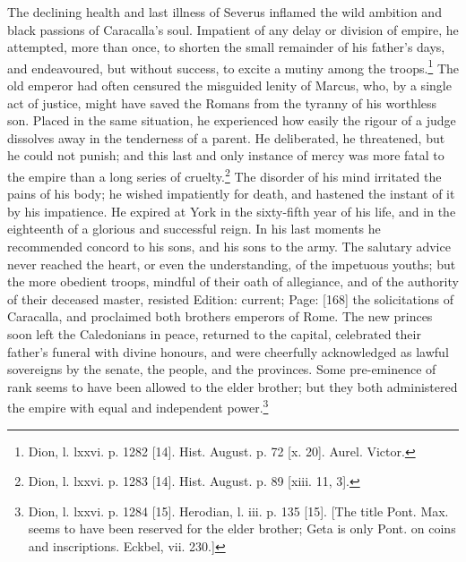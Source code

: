 The declining health and last illness of Severus inflamed the wild ambition and black passions of Caracalla\texthebrew{}’s soul. Impatient of any delay or division of empire, he attempted, more than once, to shorten the small remainder of his father\texthebrew{}’s days, and endeavoured, but without success, to excite a mutiny among the troops.\footnote{Dion, l. lxxvi. p. 1282 [14]. Hist. August. p. 72 [x. 20]. Aurel. Victor.} The old emperor had often censured the misguided lenity of Marcus, who, by a single act of justice, might have saved the Romans from the tyranny of his worthless son. Placed in the same situation, he experienced how easily the rigour of a judge dissolves away in the tenderness of a parent. He deliberated, he threatened, but he could not punish; and this last and only instance of mercy was more fatal to the empire than a long series of cruelty.\footnote{Dion, l. lxxvi. p. 1283 [14]. Hist. August. p. 89 [xiii. 11, 3].} The disorder of his mind irritated the pains of his body; he wished impatiently for death, and hastened the instant of it by his impatience. He expired at York in the sixty-fifth year of his life, and in the eighteenth of a glorious and successful reign. In his last moments he recommended concord to his sons, and his sons to the army. The salutary advice never reached the heart, or even the understanding, of the impetuous youths; but the more obedient troops, mindful of their oath of allegiance, and of the authority of their deceased master, resisted Edition: current; Page: [168] the solicitations of Caracalla, and proclaimed both brothers emperors of Rome. The new princes soon left the Caledonians in peace, returned to the capital, celebrated their father\texthebrew{}’s funeral with divine honours, and were cheerfully acknowledged as lawful sovereigns by the senate, the people, and the provinces. Some pre-eminence of rank seems to have been allowed to the elder brother; but they both administered the empire with equal and independent power.\footnote{Dion, l. lxxvi. p. 1284 [15]. Herodian, l. iii. p. 135 [15]. [The title Pont. Max. seems to have been reserved for the elder brother; Geta is only Pont. on coins and inscriptions. Eckbel, vii. 230.]}


